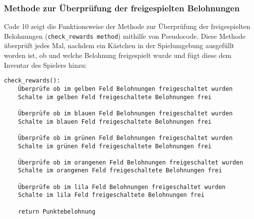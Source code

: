 \subsubsection{Methode zur Überprüfung der freigespielten Belohnungen}
\begin{minipage}{\linewidth}
Code 10 zeigt die Funktionsweise der Methode zur Überprüfung der freigespielten Belohnungen (\texttt{check\_rewards method}) mithilfe von Pseudocode. Diese Methode überprüft jedes Mal, nachdem ein Kästchen in der Spielumgebung ausgefüllt worden ist, ob und welche Belohnung freigespielt wurde und fügt diese dem Inventar des Spielers hinzu:
\vspace{0.5cm}
\begin{lstlisting}[caption={Methode zur Überprüfung der freigespielten Belohnungen}]
check_rewards():
	Überprüfe ob im gelben Feld Belohnungen freigeschaltet wurden
	Schalte im gelben Feld freigeschaltete Belohnungen frei
	
	Überprüfe ob im blauen Feld Belohnungen freigeschaltet wurden
	Schalte im blauen Feld freigeschaltete Belohnungen frei
	
	Überprüfe ob im grünen Feld Belohnungen freigeschaltet wurden
	Schalte im grünen Feld freigeschaltete Belohnungen frei
	
	Überprüfe ob im orangenen Feld Belohnungen freigeschaltet wurden
	Schalte im orangenen Feld freigeschaltete Belohnungen frei
	
	Überprüfe ob im lila Feld Belohnungen freigeschaltet wurden
	Schalte im lila Feld freigeschaltete Belohnungen frei
	
	return Punktebelohnung
\end{lstlisting}
\end{minipage}
